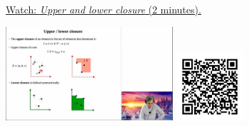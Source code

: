 
\begin{minipage}{10cm}
    \href{https://act4e-spring21.netlify.app/videos/spring2021-design:up-low-closure.html}{Watch: \emph{Upper and lower closure} (2 minutes).}
        
    \href{https://act4e-spring21.netlify.app/videos/spring2021-design:up-low-closure.html}{\includegraphics[height=3.5cm]{spring2021-design:up-low-closure/thumbnails.jpg}}
    \href{https://act4e-spring21.netlify.app/videos/spring2021-design:up-low-closure.html}{\includegraphics[height=2.5cm]{spring2021-design:up-low-closure/qrcode.png}}
\end{minipage}
